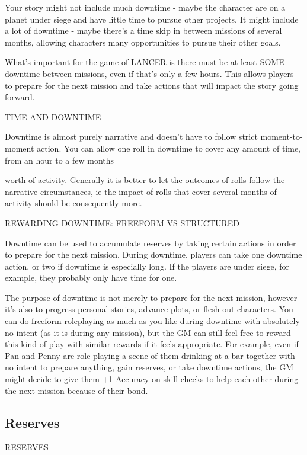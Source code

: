 Your story might not include much downtime - maybe the character are on a planet under siege
and have little time to pursue other projects. It might include a lot of downtime - maybe there’s a
time skip in between missions of several months, allowing characters many opportunities to
pursue their other goals.


What’s important for the game of LANCER is there must be at least SOME downtime between
missions, even if that’s only a few hours. This allows players to prepare for the next mission and
take actions that will impact the story going forward.


                                           TIME AND DOWNTIME


Downtime is almost purely narrative and doesn’t have to follow strict moment-to-moment action.
You can allow one roll in downtime to cover any amount of time, from an hour to a few months




worth of activity. Generally it is better to let the outcomes of rolls follow the narrative
circumstances, ie the impact of rolls that cover several months of activity should be
consequently more.


                      REWARDING DOWNTIME: FREEFORM VS STRUCTURED


Downtime can be used to accumulate reserves by taking certain actions in order to prepare for
the next mission. During downtime, players can take one downtime action, or two if downtime is
especially long. If the players are under siege, for example, they probably only have time for one.


The purpose of downtime is not merely to prepare for the next mission, however - it’s also to
progress personal stories, advance plots, or flesh out characters. You can do freeform
roleplaying as much as you like during downtime with absolutely no intent (as it is during any
mission), but the GM can still feel free to reward this kind of play with similar rewards if it
feels appropriate. For example, even if Pan and Penny are role-playing a scene of them drinking
at a bar together with no intent to prepare anything, gain reserves, or take downtime actions, the
GM might decide to give them +1 Accuracy on skill checks to help each other during the next
mission because of their bond.


\subsection{Reserves}
                                                 RESERVES

